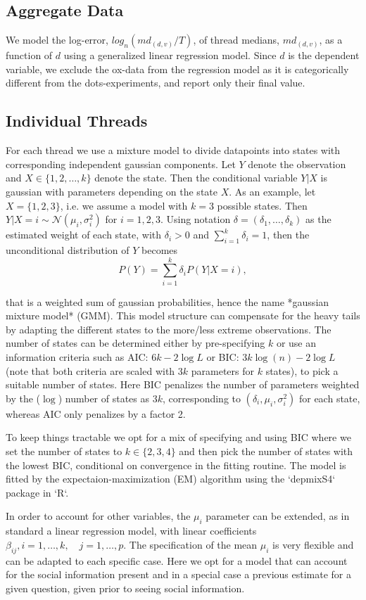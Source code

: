 \documentclass[10pt,a4paper,twocolumn,lineno]{article}
\begin{document}
\subsection{Aggregate Data}
\noindent
We model the log-error, $log_n(md_{(d,v)}/T)$, of thread medians, $md_{(d,v)}$, as a function of $d$ using a generalized linear regression model. Since $d$ is the dependent variable, we exclude the ox-data from the regression model as it is categorically different from the dots-experiments, and report only their final value. 

\subsection{Individual Threads}
\noindent
For each thread we use a mixture model to divide datapoints into states with corresponding independent gaussian components. Let $Y$ denote the observation and $X\in\{1,2,\dots,k\}$ denote the state. Then the conditional variable $Y|X$ is gaussian with parameters depending on the state $X$. 
As an example, let $X=\{1,2,3\}$, i.e. we assume a model with $k=3$ possible states. Then $Y|X=i \sim \mathcal{N}(\mu_i,\sigma_i^2)$ for $i=1,2,3$. Using notation $\delta = (\delta_1,\dots,\delta_k)$ as the estimated weight of each state, with $\delta_i >0$ and $\sum_{i=1}^k\delta_i = 1$, then the unconditional distribution of $Y$ becomes
$$
  P(Y) = \sum_{i=1}^k \delta_i P(Y|X=i),
$$

that is a weighted sum of gaussian probabilities, hence the name *gaussian mixture model* (GMM). This model structure can compensate for the heavy tails by adapting the different states to the more/less extreme observations. The number of states can be determined either by pre-specifying $k$ or use an information criteria such as AIC: $6k-2\log L$ or BIC: $3k\log(n)-2\log L$ (note that both criteria are scaled with $3k$ parameters for $k$ states), to pick a suitable number of states. Here BIC penalizes the number of parameters weighted by the ($\log$) number of states as $3k$, corresponding to $(\delta_i,\mu_i,\sigma^2_i)$ for each state, whereas AIC only penalizes by a factor 2. 

To keep things tractable we opt for a mix of specifying and using BIC where we set the number of states to $k\in\{2,3,4\}$ and then pick the number of states with the lowest BIC, conditional on convergence in the fitting routine. The model is fitted by the expectaion-maximization (EM) algorithm using the `depmixS4` package in `R`.

In order to account for other variables, the $\mu_i$ parameter can be extended, as in standard a linear regression model, with linear coefficients $\beta_{ij}, i=1,\dots,k, \quad j=1,\dots,p$. The specification of the mean $\mu_i$ is very flexible and can be adapted to each specific case. Here we opt for a model that can account for the social information present and in a special case a previous estimate for a given question, given prior to seeing social information.
\end{document}
